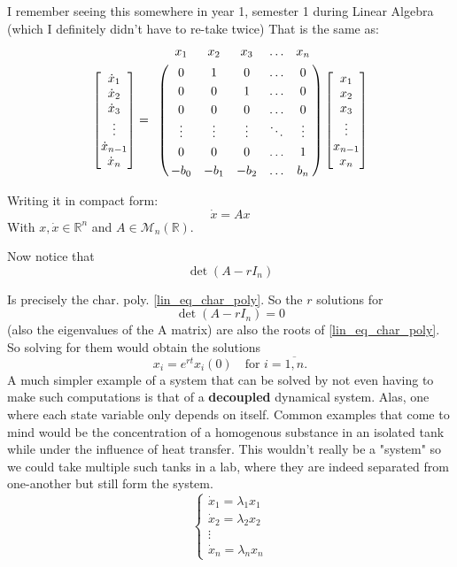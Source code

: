 I remember seeing this somewhere in year 1, semester 1 during Linear Algebra (which I definitely didn't have to re-take twice)
That is the same as:
\begin{align*}
	\begin{bmatrix}
		\dot{x}_1     \\
		\dot{x}_2     \\
		\dot{x}_3     \\
		\vdots        \\
		\dot{x}_{n-1} \\
		\dot{x}_n
	\end{bmatrix} =
	\bordermatrix{ & x_1    & x_2    & x_3    & \ldots & x_n \cr
		& 0      & 1      & 0      & \ldots & 0 \cr
		& 0      & 0      & 1      & \ldots & 0 \cr
		& 0      & 0      & 0      & \ldots & 0 \cr
		& \vdots & \vdots & \vdots & \ddots & \vdots \cr
		& 0      & 0      & 0      & \ldots & 1 \cr
	& -b_0   & -b_1   & -b_2   & \ldots & b_n }
	\begin{bmatrix}
		x_1     \\
		x_2     \\
		x_3     \\
		\vdots  \\
		x_{n-1} \\
		x_n
	\end{bmatrix}
\end{align*}

Writing it in compact form:
\[
	\dot{x} = A x
\]
With $x, \dot{x} \in \mathbb{R}^n$ and $A \in \mathcal{M}_n(\mathbb{R})$.

Now notice that
\[
	\det (A- r I_n)
\]

Is precisely the char. poly. \ref{lin_eq_char_poly}. So the $r$ solutions for
\[
	\det (A - r I_n) =0
\]
(also the eigenvalues of the A matrix) are also the roots of \ref{lin_eq_char_poly}. So solving for them would obtain the solutions
\[
	x_i = e^{rt}x_i(0) \quad \text{for  } i = \overline{1,n}.
\]
A much simpler example of a system that can be solved by not even having to make such computations is that of a \textbf{decoupled} dynamical system. Alas, one where each state variable only depends on itself. Common examples that come to mind would be the concentration of a homogenous substance in an isolated tank while under the influence of heat transfer. This wouldn't really be a "system" so we could take multiple such tanks in a lab, where they are indeed separated from one-another but still form the system.
\begin{equation*}
	\begin{cases}
		\dot{x}_1 = \lambda_1 x_1 \\
		\dot{x}_2 = \lambda_2 x_2 \\
		\vdots                    \\
		\dot{x}_n = \lambda_n x_n
	\end{cases}
\end{equation*}

